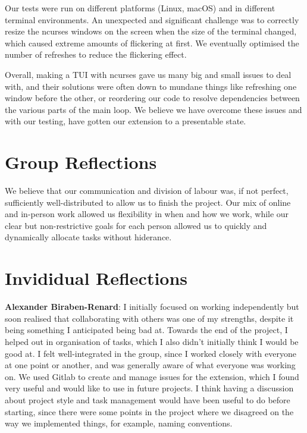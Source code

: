 \documentclass{ictex}
\begin{document}
Our tests were run on different platforms (Linux, macOS) and in different terminal environments. An unexpected and significant challenge was to correctly resize the ncurses windows on the screen when the size of the terminal changed, which caused extreme amounts of flickering at first. We eventually optimised the number of refreshes to reduce the flickering effect.

Overall, making a TUI with ncurses gave us many big and small issues to deal with, and their solutions were often down to mundane things like refreshing one window before the other, or reordering our code to resolve dependencies between the various parts of the main loop. We believe we have overcome these issues and with our testing, have gotten our extension to a presentable state.

\section{Group Reflections}

We believe that our communication and division of labour was, if not perfect, sufficiently well-distributed to allow us to finish the project. Our mix of online and in-person work allowed us flexibility in when and how we work, while our clear but non-restrictive goals for each person allowed us to quickly and dynamically allocate tasks without hiderance.

\section{Invididual Reflections}

\textbf{Alexander Biraben-Renard}: I initially focused on working independently but soon realised that collaborating with others was one of my strengths, despite it being something I anticipated being bad at. Towards the end of the project, I helped out in organisation of tasks,  which I also didn't initially think I would be good at. I felt well-integrated in the group, since I worked closely with everyone at one point or another, and was generally aware of what everyone was working on. We used Gitlab to create and manage issues for the extension, which I found very useful and would like to use in future projects. I think having a discussion about project style and task management would have been useful to do before starting, since there were some points in the project where we disagreed on the way we implemented things, for example, naming conventions.
\end{document}

